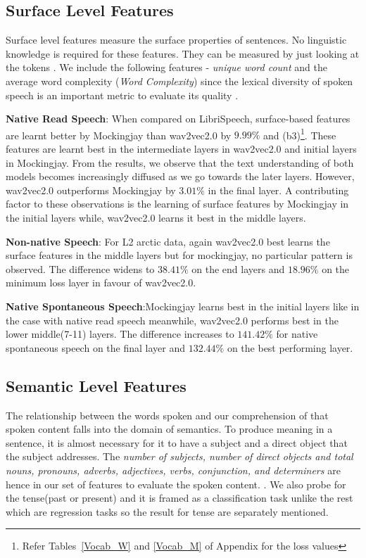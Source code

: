 \documentclass[sigconf]{acmart}
\newcommand{\wv}{wav2vec2.0\xspace}
\newcommand{\mj}{Mockingjay\xspace}
\begin{document}
\subsection{Surface Level Features}
\label{sec:surface level features}
Surface level features measure the surface properties of sentences. No linguistic knowledge is required for these features. They can be measured by just looking at the tokens \cite{conneau2018you}. We include the following features - \emph{unique word count} and the average word complexity (\emph{Word Complexity}) since the lexical diversity of spoken speech is an important metric to evaluate its quality \cite{read2006investigation}. 

 
\textbf{Native Read Speech}:
When compared on LibriSpeech, surface-based features are learnt better by Mockingjay than wav2vec2.0 by $9.99\%$ and (b3)\footnote{Refer Tables~\ref{Vocab_W} and \ref{Vocab_M} of Appendix for the loss values}. These features are learnt best in the intermediate layers in wav2vec2.0 and initial layers in Mockingjay. From the results, we observe that the text understanding of both models becomes increasingly diffused as we go towards the later layers. However, wav2vec2.0 outperforms Mockingjay by $3.01\%$ in the final layer. A contributing factor to these observations is the learning of surface features by Mockingjay in the initial layers while, {\wv} learns it best in the middle layers.

\textbf{Non-native Speech}:
For L2 arctic data, again {\wv} best learns the surface features in the middle layers but for mockingjay, no particular pattern is observed. The difference widens to $38.41\%$ on the end layers and $18.96\%$  on the minimum loss layer in favour of {\wv}.

\textbf{Native Spontaneous Speech}:{\mj} learns best in the initial layers like in the case with native read speech meanwhile, {\wv} performs best in the lower middle(7-11) layers. The difference increases to $141.42\%$ for native spontaneous speech on the final layer and $132.44\%$ on the best performing layer.



\subsection{Semantic Level Features}
\label{sec:semantic level features}
The relationship between the words spoken and our comprehension of that spoken content falls into the domain of semantics. To produce meaning in a sentence, it is almost necessary for it to have a subject and a direct object that the subject addresses. The \emph{number of subjects, number of direct objects and total nouns, pronouns, adverbs, adjectives, verbs, conjunction, and determiners} are hence in our set of features to evaluate the spoken content. \cite{conneau2018you,jawahar-etal-2019-bert}. We also probe for the tense(past or present) and it is framed as a classification task unlike the rest which are regression tasks so the result for tense are separately mentioned.
\end{document}
